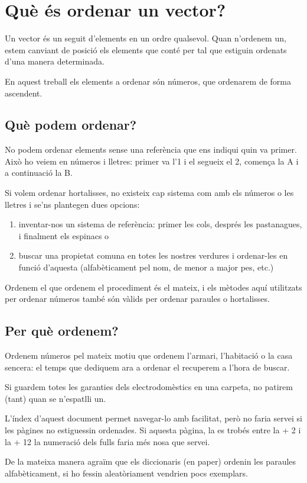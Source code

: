\chapter{Què és ordenar un vector?}
Un vector és un seguit d'elements en un ordre qualsevol.
Quan n'ordenem un, estem canviant de posició els elements que conté per tal que estiguin ordenats d'una manera determinada.

En aquest treball els elements a ordenar són números, que ordenarem de forma ascendent.

\section{Què podem ordenar?}
No podem ordenar elements sense una referència que ens indiqui quin va primer.
Això ho veiem en números i lletres: primer va l'1 i el segueix el 2, comença la A i a continuació la B.

Si volem ordenar hortalisses, no existeix cap sistema com amb els números o les lletres i se'ns plantegen dues opcions:
\begin{enumerate}[label={\alph*)}]
	\item inventar-nos un sistema de referència: primer les cols, després les pastanagues, i finalment els espinacs o
	\item buscar una propietat comuna en totes les nostres verdures i ordenar-les en funció d'aquesta (alfabèticament pel nom, de menor a major pes, etc.)
\end{enumerate}

Ordenem el que ordenem el procediment és el mateix, i els mètodes aquí utilitzats per ordenar números també són vàlids per ordenar paraules o hortalisses.

\pagebreak
\section{Per què ordenem?}
Ordenem números pel mateix motiu que ordenem l'armari, l'habitació o la casa sencera: el temps que dediquem ara a ordenar el recuperem a l'hora de buscar.

Si guardem totes les garanties dels electrodomèstics en una carpeta, no patirem (tant) quan se n'espatlli un.

L'índex d'aquest document permet navegar-lo amb facilitat, però no faria servei si les pàgines no estiguessin ordenades. Si aquesta pàgina, la {\thepage} es trobés entre la {\the\numexpr \thepage + 2} i la {\the\numexpr \thepage + 12} la numeració dels fulls faria més nosa que servei.

De la mateixa manera agraïm que els diccionaris (en paper) ordenin les paraules alfabèticament, si ho fessin aleatòriament vendrien pocs exemplars.